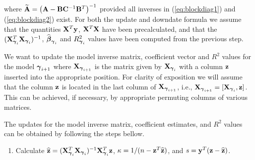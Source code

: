 {\noindent where $\widetilde{{\bf A}} = \left({\bf A}-{\bf B}{\bf C}^{-1}{\bf B}^T\right)^{-1}$
provided all inverses in (\ref{eq:blockdiag1}) and (\ref{eq:blockdiag2}) exist.
For both the update and downdate formula we assume that the quantities
${\bf X}^T{\bf y}$, ${\bf X}^T{\bf X}$ have been precalculated, and that the
$({\bf X}_{{\boldsymbol \gamma}_i}^T{\bf X}_{{\boldsymbol \gamma}_i})^{-1}$, $\widehat{{\boldsymbol \beta}}_{{\boldsymbol \gamma}_i}$ and
$R_{{\boldsymbol \gamma}_i}^2$ values have been computed from the previous step.

We want to update the model inverse matrix, coefficient vector and $R^2$ values
for the model ${\boldsymbol \gamma}_{i+1}$ where ${\bf X}_{{\boldsymbol \gamma}_{i+1}}$ is the matrix given
by ${\bf X}_{{\boldsymbol \gamma}_i}$ with a column ${\bf z}$ inserted into the appropriate
position.  For clarity of exposition we will assume that the column ${\bf z}$ is
located in the last column of ${\bf X}_{{\boldsymbol \gamma}_{i+1}}$, i.e., ${\bf X}_{{\boldsymbol \gamma}_{i+1}}
= [{\bf X}_{{\boldsymbol \gamma}_{i}},{\bf z}]$. This can be achieved, if necessary, by appropriate
permuting  columns of various matrices.

The updates for the model inverse matrix, coefficient estimates, and $R^2$
values can be obtained by following the steps bellow.
\begin{enumerate}
	\item Calculate $\widehat{{\bf z}} = ({\bf X}_{{\boldsymbol \gamma}_i}^T{\bf X}_{{\boldsymbol \gamma}_i})^{-1}{\bf X}_{{\boldsymbol \gamma}_i}^T{\bf z}$, 
	$\kappa 
	= 1/(n - {\bf z}^T\widehat{{\bf z}})$, and  $s = {\bf y}^T({\bf z} - \widehat{{\bf z}})$.
	

\end{enumerate}}
